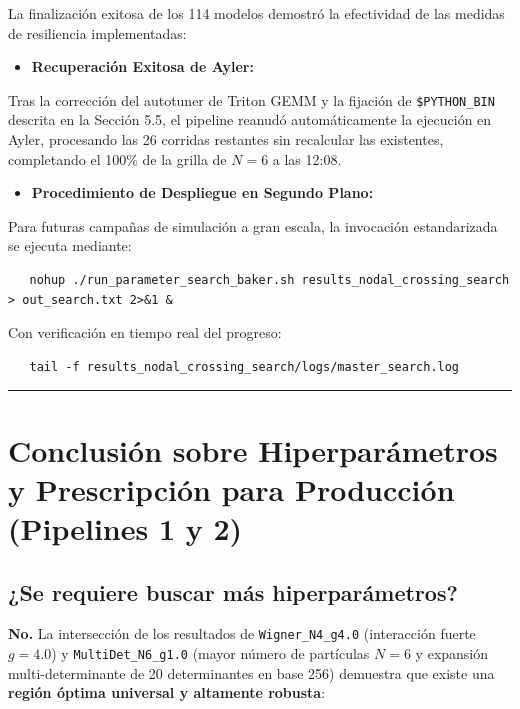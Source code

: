 \documentclass[10pt,a4paper]{article}
\begin{document}
La finalización exitosa de los 114 modelos demostró la efectividad de las medidas de resiliencia implementadas:



\begin{itemize}
\item \textbf{Recuperación Exitosa de Ayler:}
\end{itemize}

   Tras la corrección del autotuner de Triton GEMM y la fijación de \texttt{\$PYTHON\_BIN} descrita en la Sección 5.5, el pipeline reanudó automáticamente la ejecución en Ayler, procesando las 26 corridas restantes sin recalcular las existentes, completando el 100\% de la grilla de $N=6$ a las 12:08.

\begin{itemize}
\item \textbf{Procedimiento de Despliegue en Segundo Plano:}
\end{itemize}

   Para futuras campañas de simulación a gran escala, la invocación estandarizada se ejecuta mediante:

\begin{lstlisting}
   nohup ./run_parameter_search_baker.sh results_nodal_crossing_search > out_search.txt 2>&1 &
\end{lstlisting}

   Con verificación en tiempo real del progreso:

\begin{lstlisting}
   tail -f results_nodal_crossing_search/logs/master_search.log
\end{lstlisting}




\vspace{0.4cm}\hrule\vspace{0.4cm}




\section{Conclusión sobre Hiperparámetros y Prescripción para Producción (Pipelines 1 y 2)}




\subsection{¿Se requiere buscar más hiperparámetros?}

\textbf{No.} La intersección de los resultados de \texttt{Wigner\_N4\_g4.0} (interacción fuerte $g=4.0$) y \texttt{MultiDet\_N6\_g1.0} (mayor número de partículas $N=6$ y expansión multi-determinante de 20 determinantes en base 256) demuestra que existe una \textbf{región óptima universal y altamente robusta}:
\end{document}

